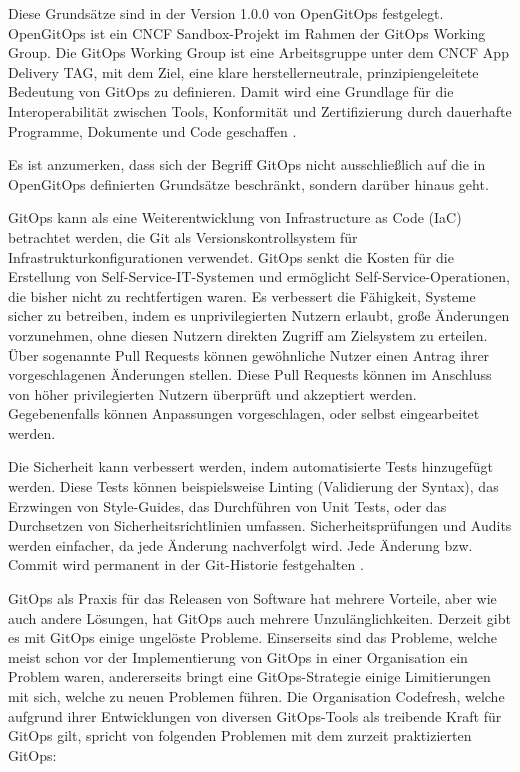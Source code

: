 \noindent
Diese Grundsätze sind in der Version 1.0.0 von OpenGitOps festgelegt.
OpenGitOps ist ein CNCF Sandbox-Projekt im Rahmen der GitOps Working Group.
Die GitOps Working Group ist eine Arbeitsgruppe unter
dem CNCF App Delivery TAG,
mit dem Ziel, eine klare herstellerneutrale,
prinzipiengeleitete Bedeutung von GitOps zu definieren.
Damit wird eine Grundlage für die Interoperabilität zwischen Tools, Konformität und Zertifizierung durch dauerhafte Programme, Dokumente und Code geschaffen
\autocite{opengitopsDocuments}.
\bigskip

\noindent
Es ist anzumerken, dass sich der Begriff GitOps nicht ausschließlich auf
die in OpenGitOps definierten Grundsätze beschränkt,
sondern darüber hinaus geht.
\bigskip

\noindent
GitOps kann als eine Weiterentwicklung von Infrastructure as Code (IaC) betrachtet werden, die Git als Versionskontrollsystem für Infrastrukturkonfigurationen verwendet.
GitOps senkt die Kosten für die Erstellung von Self-Service-IT-Systemen und ermöglicht Self-Service-Operationen, die bisher nicht zu rechtfertigen waren.
Es verbessert die Fähigkeit, Systeme sicher zu betreiben, indem es
unprivilegierten Nutzern erlaubt, große Änderungen vorzunehmen,
ohne diesen Nutzern direkten Zugriff am Zielsystem zu erteilen.
Über sogenannte Pull Requests können gewöhnliche Nutzer einen Antrag
ihrer vorgeschlagenen Änderungen stellen.
Diese Pull Requests können im Anschluss von höher privilegierten Nutzern
überprüft und akzeptiert werden.
Gegebenenfalls können Anpassungen vorgeschlagen, oder selbst eingearbeitet werden.
\bigskip

\noindent
Die Sicherheit kann verbessert werden, indem automatisierte Tests hinzugefügt werden.
Diese Tests können beispielsweise
Linting (Validierung der Syntax),
das Erzwingen von Style-Guides,
das Durchführen von Unit Tests,
oder
das Durchsetzen von Sicherheitsrichtlinien
umfassen.
Sicherheitsprüfungen und Audits werden einfacher, 
da jede Änderung nachverfolgt wird.
Jede Änderung bzw. Commit wird permanent in der Git-Historie festgehalten
\autocite{limoncelli_gitopsPathToMoreSelfService}.
\bigskip


\noindent
GitOps als Praxis für das Releasen von Software hat mehrere Vorteile,
aber wie auch andere Lösungen, hat GitOps auch mehrere Unzulänglichkeiten.
Derzeit gibt es mit GitOps einige ungelöste Probleme.
Einserseits sind das Probleme, welche meist schon 
vor der Implementierung von GitOps in einer Organisation ein Problem waren,
andererseits bringt eine GitOps-Strategie einige Limitierungen mit sich,
welche zu neuen Problemen führen.
Die Organisation Codefresh,
welche aufgrund ihrer Entwicklungen
von diversen GitOps-Tools
als treibende Kraft für GitOps gilt,
spricht von folgenden Problemen mit dem zurzeit praktizierten GitOps:

